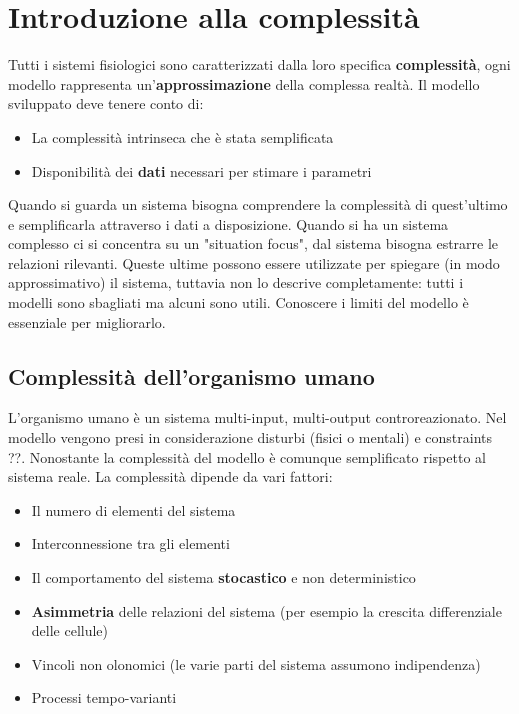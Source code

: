 \chapter{Introduzione alla complessità}
Tutti i sistemi fisiologici sono caratterizzati dalla loro specifica \textbf{complessità}, ogni modello rappresenta un'\textbf{approssimazione} della complessa realtà. Il modello sviluppato deve tenere conto di: 
\begin{itemize}
    \item La complessità intrinseca che è stata semplificata
    \item Disponibilità dei \textbf{dati} necessari per stimare i parametri
\end{itemize}
Quando si guarda un sistema bisogna comprendere la complessità di quest'ultimo e semplificarla attraverso i dati a disposizione.
Quando si ha un sistema complesso ci si concentra su un "situation focus", dal sistema bisogna estrarre le relazioni rilevanti. Queste ultime possono essere utilizzate per spiegare (in modo approssimativo) il sistema, tuttavia non lo descrive completamente: tutti i modelli sono sbagliati ma alcuni sono utili. Conoscere i limiti del modello è essenziale per migliorarlo.

\section{Complessità dell'organismo umano}


L'organismo umano è un sistema multi-input, multi-output controreazionato. Nel modello vengono presi in considerazione disturbi (fisici o mentali) e constraints ??. Nonostante la complessità del modello è comunque semplificato rispetto al sistema reale. La complessità dipende da vari fattori:
\begin{itemize}
    \item Il numero di elementi del sistema 
    \item Interconnessione tra gli elementi
    \item Il comportamento del sistema \textbf{stocastico} e non deterministico
    \item \textbf{Asimmetria} delle relazioni del sistema (per esempio la crescita differenziale delle cellule)
    \item Vincoli non olonomici (le varie parti del sistema assumono indipendenza) 
    \item Processi tempo-varianti
\end{itemize}


